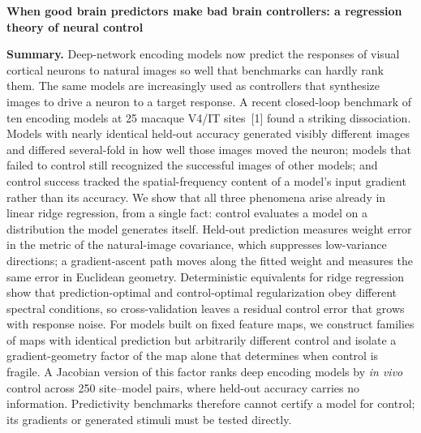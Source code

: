 \documentclass[12pt,letterpaper]{article}
\begin{document}
{\large\bfseries When good brain predictors make bad brain controllers: a regression theory of neural control\par}
\vspace{2pt}

\textbf{Summary.}
Deep-network encoding models now predict the responses of visual cortical neurons to natural images so well that benchmarks can hardly rank them. The same models are increasingly used as controllers that synthesize images to drive a neuron to a target response. A recent closed-loop benchmark of ten encoding models at 25 macaque V4/IT sites~[1] found a striking dissociation. Models with nearly identical held-out accuracy generated visibly different images and differed several-fold in how well those images moved the neuron; models that failed to control still recognized the successful images of other models; and control success tracked the spatial-frequency content of a model's input gradient rather than its accuracy. We show that all three phenomena arise already in linear ridge regression, from a single fact: control evaluates a model on a distribution the model generates itself. Held-out prediction measures weight error in the metric of the natural-image covariance, which suppresses low-variance directions; a gradient-ascent path moves along the fitted weight and measures the same error in Euclidean geometry. Deterministic equivalents for ridge regression show that prediction-optimal and control-optimal regularization obey different spectral conditions, so cross-validation leaves a residual control error that grows with response noise. For models built on fixed feature maps, we construct families of maps with identical prediction but arbitrarily different control and isolate a gradient-geometry factor of the map alone that determines when control is fragile. A Jacobian version of this factor ranks deep encoding models by \emph{in vivo} control across 250 site--model pairs, where held-out accuracy carries no information. Predictivity benchmarks therefore cannot certify a model for control; its gradients or generated stimuli must be tested directly.
\end{document}

